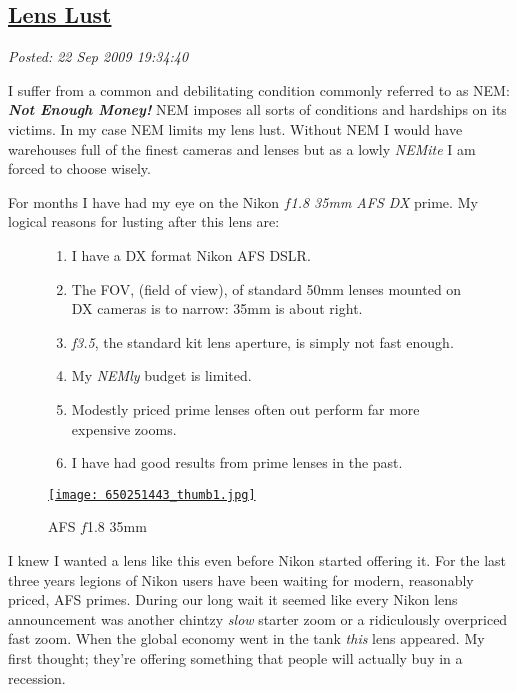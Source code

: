 %

\subsection*{\href{http://bakerjd99.wordpress.com/2009/09/22/lens-lust/}{Lens Lust}}


\noindent\emph{Posted: 22 Sep 2009 19:34:40}
\vspace{6pt}

I suffer from a common and debilitating condition commonly referred to
as NEM: \emph{\textbf{Not Enough Money!}} NEM imposes all sorts of
conditions and hardships on its victims. In my case NEM limits my lens
lust. Without NEM I would have warehouses full of the finest cameras and
lenses but as a lowly \emph{NEMite} I am forced to choose wisely.

For months I have had my eye on the Nikon \emph{$f$1.8 35mm AFS DX} prime.
My logical reasons for lusting after this lens are:

\captionsetup[figure]{labelformat=empty}
\begin{figure}[ht]
\begin{minipage}[b]{0.65\textwidth}
\begin{enumerate}
\item
  I have a DX format Nikon AFS DSLR.
\item
  The FOV, (field of view), of standard 50mm lenses mounted on DX
  cameras is to narrow: 35mm is about right.
\item
  \emph{f3.5}, the standard kit lens aperture, is simply not fast
  enough.
\item
  My \emph{NEMly} budget is limited.
\item
  Modestly priced prime lenses often out perform far more expensive
  zooms.
\item
  I have had good results from prime lenses in the past.
\end{enumerate}
\end{minipage}
\hspace{1pt}
\begin{minipage}[b]{0.32\textwidth}
\centering
\href{http://bakerjd99.files.wordpress.com/2009/09/6502514431.jpg}{\texttt{[image: 650251443\_thumb1.jpg]}}
\caption{AFS $f$1.8 35mm}
\label{fig:88X0}
\end{minipage}
\end{figure}

I knew I wanted a lens like this even before Nikon started offering it.
For the last three years legions of Nikon users have been waiting for
modern, reasonably priced, AFS primes. During our long wait it seemed
like every Nikon lens announcement was another chintzy
\emph{slow} starter zoom or a ridiculously overpriced fast zoom. When the
global economy went in the tank \emph{this} lens appeared. My first
thought; they're offering something that people will actually buy in a
recession.

